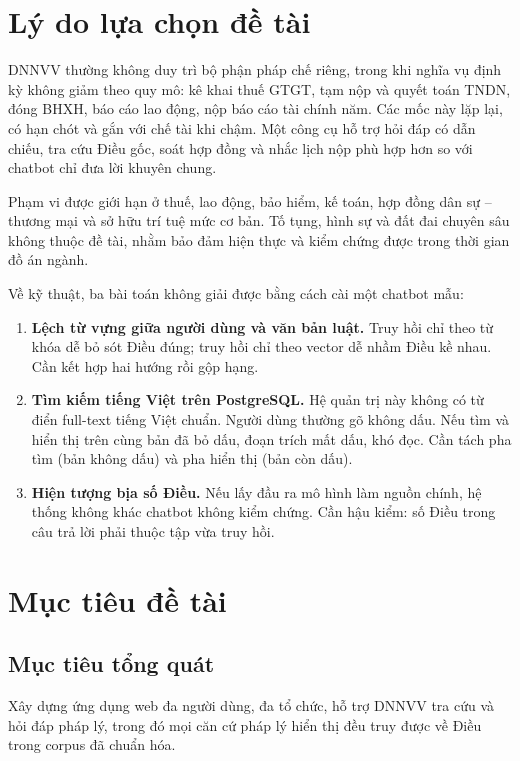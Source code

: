 \section{Lý do lựa chọn đề tài}

DNNVV thường không duy trì bộ phận pháp chế riêng, trong khi nghĩa vụ định kỳ
không giảm theo quy mô: kê khai thuế GTGT, tạm nộp và quyết toán TNDN, đóng BHXH,
báo cáo lao động, nộp báo cáo tài chính năm. Các mốc này lặp lại, có hạn chót và
gắn với chế tài khi chậm. Một công cụ hỗ trợ hỏi đáp có dẫn chiếu, tra cứu Điều
gốc, soát hợp đồng và nhắc lịch nộp phù hợp hơn so với chatbot chỉ đưa lời khuyên
chung.

Phạm vi được giới hạn ở thuế, lao động, bảo hiểm, kế toán, hợp đồng dân sự --
thương mại và sở hữu trí tuệ mức cơ bản. Tố tụng, hình sự và đất đai chuyên sâu
không thuộc đề tài, nhằm bảo đảm hiện thực và kiểm chứng được trong thời gian đồ
án ngành.

Về kỹ thuật, ba bài toán không giải được bằng cách cài một chatbot mẫu:

\begin{enumerate}
    \item \textbf{Lệch từ vựng giữa người dùng và văn bản luật.} Truy hồi chỉ
    theo từ khóa dễ bỏ sót Điều đúng; truy hồi chỉ theo vector dễ nhầm Điều kề
    nhau. Cần kết hợp hai hướng rồi gộp hạng.
    \item \textbf{Tìm kiếm tiếng Việt trên PostgreSQL.} Hệ quản trị này không có
    từ điển full-text tiếng Việt chuẩn. Người dùng thường gõ không dấu. Nếu tìm
    và hiển thị trên cùng bản đã bỏ dấu, đoạn trích mất dấu, khó đọc. Cần tách
    pha tìm (bản không dấu) và pha hiển thị (bản còn dấu).
    \item \textbf{Hiện tượng bịa số Điều.} Nếu lấy đầu ra mô hình làm nguồn
    chính, hệ thống không khác chatbot không kiểm chứng. Cần hậu kiểm: số Điều
    trong câu trả lời phải thuộc tập vừa truy hồi.
\end{enumerate}

\section{Mục tiêu đề tài}

\subsection{Mục tiêu tổng quát}

Xây dựng ứng dụng web đa người dùng, đa tổ chức, hỗ trợ DNNVV tra cứu và hỏi đáp
pháp lý, trong đó mọi căn cứ pháp lý hiển thị đều truy được về Điều trong corpus
đã chuẩn hóa.

